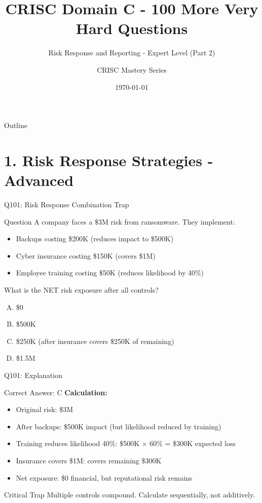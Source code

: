 \documentclass{beamer}
\title{CRISC Domain C - 100 More Very Hard Questions}
\subtitle{Risk Response and Reporting - Expert Level (Part 2)}
\author{CRISC Mastery Series}
\date{\today}
\begin{document}
	
	\begin{frame}
		\titlepage
	\end{frame}
	
	\begin{frame}{Outline}
		\tableofcontents
	\end{frame}
	
	
	\section{1. Risk Response Strategies - Advanced}
	
	\begin{frame}{Q101: Risk Response Combination Trap}
		\begin{block}{Question}
			A company faces a \$3M risk from ransomware. They implement:
			\begin{itemize}
				\item Backups costing \$200K (reduces impact to \$500K)
				\item Cyber insurance costing \$150K (covers \$1M)
				\item Employee training costing \$50K (reduces likelihood by 40\%)
			\end{itemize}
			What is the NET risk exposure after all controls?
		\end{block}
		\begin{enumerate}[(A)]
			\item \$0
			\item \$500K
			\item \$250K (after insurance covers \$250K of remaining)
			\item \$1.5M
		\end{enumerate}
	\end{frame}
	
	\begin{frame}{Q101: Explanation}
		\begin{block}{Correct Answer: C}
			\textbf{Calculation:}
			\begin{itemize}
				\item Original risk: \$3M
				\item After backups: \$500K impact (but likelihood reduced by training)
				\item Training reduces likelihood 40\%: \$500K × 60\% = \$300K expected loss
				\item Insurance covers \$1M: covers remaining \$300K
				\item Net exposure: \$0 financial, but reputational risk remains
			\end{itemize}
		\end{block}
		\begin{alertblock}{Critical Trap}
			Multiple controls compound. Calculate sequentially, not additively.
		\end{alertblock}
	\end{frame}
	
\end{document}
